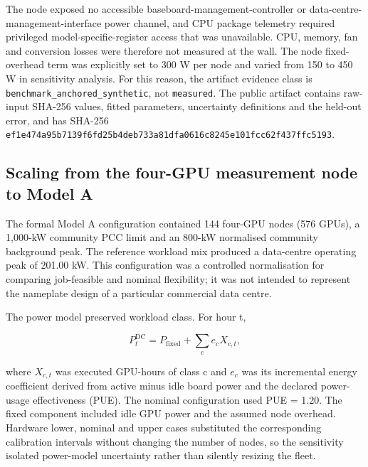 \documentclass[10pt,a4paper]{article}
\begin{document}
The node exposed no accessible baseboard-management-controller or data-centre-management-interface power channel, and CPU package telemetry required privileged model-specific-register access that was unavailable. CPU, memory, fan and conversion losses were therefore not measured at the wall. The node fixed-overhead term was explicitly set to 300 W per node and varied from 150 to 450 W in sensitivity analysis. For this reason, the artifact evidence class is \nolinkurl{benchmark_anchored_synthetic}, not \nolinkurl{measured}. The public artifact contains raw-input SHA-256 values, fitted parameters, uncertainty definitions and the held-out error, and has SHA-256 \texttt{ef1e\allowbreak{}474a\allowbreak{}95b7\allowbreak{}139f\allowbreak{}6fd2\allowbreak{}5b4d\allowbreak{}eb73\allowbreak{}3a81\allowbreak{}dfa0\allowbreak{}616c\allowbreak{}8245\allowbreak{}e101\allowbreak{}fcc6\allowbreak{}2f43\allowbreak{}7ffc\allowbreak{}5193}.


\subsection{Scaling from the four-GPU measurement node to Model A}

The formal Model A configuration contained 144 four-GPU nodes (576 GPUs), a 1,000-kW community PCC limit and an 800-kW normalised community background peak. The reference workload mix produced a data-centre operating peak of 201.00 kW. This configuration was a controlled normalisation for comparing job-feasible and nominal flexibility; it was not intended to represent the nameplate design of a particular commercial data centre.


The power model preserved workload class. For hour t,


\begin{equation*}
P^{\mathrm{DC}}_t=P_{\mathrm{fixed}}+\sum_c e_cX_{c,t},
\end{equation*}

where \(X_{c,t}\) was executed GPU-hours of class c and \(e_c\) was its incremental energy coefficient derived from active minus idle board power and the declared power-usage effectiveness (PUE). The nominal configuration used PUE = 1.20. The fixed component included idle GPU power and the assumed node overhead. Hardware lower, nominal and upper cases substituted the corresponding calibration intervals without changing the number of nodes, so the sensitivity isolated power-model uncertainty rather than silently resizing the fleet.
\end{document}
